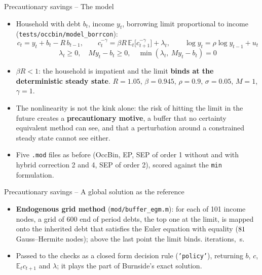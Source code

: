 \documentclass[11pt,aspectratio=169]{beamer}
\newcommand{\E}{\mathbb{E}}
\newcommand{\code}[1]{\texttt{#1}}
\begin{document}
\begin{frame}{Precautionary savings -- The model}

\begin{itemize}

\item Household with debt $b_t$, income $y_t$, borrowing limit proportional to income (\code{tests/occbin/model\_borrcon}):
  \[
  c_t = y_t + b_t - R\,b_{t-1},\qquad c_t^{-\gamma} = \beta R\,\E_t\big[c_{t+1}^{-\gamma}\big] + \lambda_t,\qquad \log y_t = \rho\log y_{t-1} + u_t
  \]
  \[
  \boxed{\lambda_t\geq0,\quad M y_t - b_t\geq 0,\quad \min(\lambda_t,\ M y_t - b_t) = 0}
  \]

\item $\beta R<1$: the household is impatient and the limit \textbf{binds at the deterministic steady state}. $R=1.05$, $\beta=0.945$, $\rho=0.9$, $\sigma=0.05$, $M=1$, $\gamma=1$.\newline

\item The nonlinearity is not the kink alone: the risk of hitting the limit in the future creates a \textbf{precautionary motive}, a buffer that no certainty equivalent method can see, and that a perturbation around a constrained steady state cannot see either.\newline

\item Five \code{.mod} files as before (OccBin, EP, SEP of order 1 without and with hybrid correction 2 and 4, SEP of order 2), scored against the \code{min} formulation.

\end{itemize}

\end{frame}

\begin{frame}{Precautionary savings -- A global solution as the reference}

\begin{itemize}

\item \textbf{Endogenous grid method} (\code{mod/buffer\_egm.m}): for each of 101 income nodes, a grid of 600 end of period debts, the top one at the limit, is mapped onto the inherited debt that satisfies the Euler equation with equality ($81$ Gauss--Hermite nodes); above the last point the limit binds. \bsEgmIterations{} iterations, \bsEgmTime\,s.\newline

\item Passed to the checks as a closed form decision rule (\code{'policy'}), returning $b$, $c$, $\E_t c_{t+1}$ and $\lambda$; it plays the part of Burnside's exact solution.

\end{itemize}

\end{frame}
\end{document}
